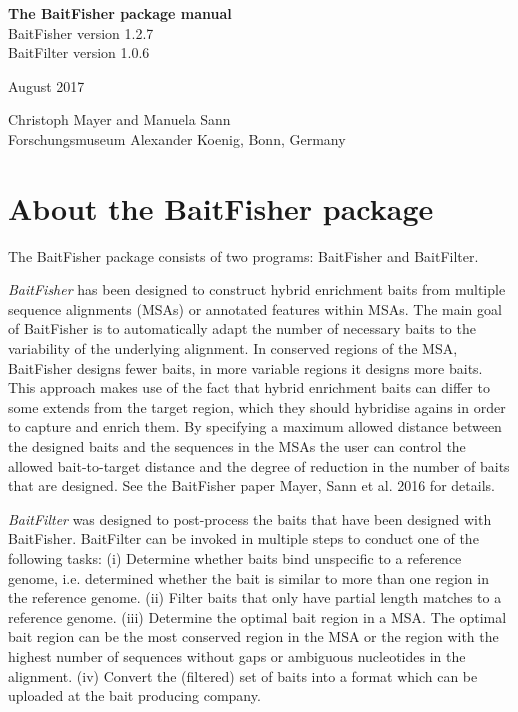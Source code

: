 \documentclass[a4paper,pdflatex,11pt]{article}
\begin{document}
\thispagestyle{empty}
{\centering 
{\large\bf     The BaitFisher package manual\\[4mm]}
{\large     BaitFisher version 1.2.7\\}
{\large     BaitFilter version 1.0.6\\[5mm]}

{\large            August 2017\\[5mm]}

{\large            Christoph Mayer and Manuela Sann\\}
{\large            Forschungsmuseum Alexander Koenig, Bonn, Germany\\}
\vspace{1cm}
}

\section{About the BaitFisher package}


The BaitFisher package consists of two programs: BaitFisher and
BaitFilter.

{\em BaitFisher} has been designed to construct hybrid enrichment baits from
multiple sequence alignments (MSAs) or annotated features within MSAs. The
main goal of BaitFisher is to automatically adapt the number of necessary baits to the
variability of the underlying alignment. 
In conserved regions of the MSA, BaitFisher designs fewer baits, in more variable regions
it designs more baits.
This approach makes use of the fact
that hybrid enrichment baits can differ to some extends from the target
region, which they should hybridise agains in order to capture and enrich them. 
By specifying a maximum allowed distance between the designed baits and the sequences in the
MSAs the user can control the allowed bait-to-target distance and the
degree of reduction in the number of baits that are designed. See the
BaitFisher paper Mayer, Sann et al. 2016 for details.

{\em BaitFilter} was designed to post-process the baits that have been designed with BaitFisher.
BaitFilter can be invoked in multiple steps to conduct one of the following tasks:
(i) Determine whether baits bind
unspecific to a reference genome, i.e. determined whether the bait is similar to more than one
region in the reference genome. (ii) Filter baits that only
have partial length matches to a reference genome. (iii) Determine
the optimal bait region in a MSA. The optimal bait region
can be the most conserved region in the MSA or the region with the
highest number of sequences without gaps or ambiguous nucleotides in the alignment.
(iv) Convert the (filtered) set of baits into a format which can be uploaded at the bait
producing company.
\end{document}
